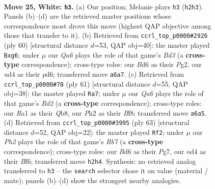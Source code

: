 \documentclass[11pt]{article}
\begin{document}
\clearpage

\begin{figure}[p]\centering
\begin{subfigure}{0.46\textwidth}\centering
\resizebox{\linewidth}{!}{%
\newchessgame
\chessboard[
  setfen={4r1k1/p4p1p/Q2B2p1/8/3nr3/P4q2/5P1P/R5K1 w - - 5 25},
  showmover=false,
  pgfstyle=straightmove, color=movearrow, markmove={h2-h3}
]}
\caption{}
\end{subfigure}\hfill
\begin{subfigure}{0.46\textwidth}\centering
\resizebox{\linewidth}{!}{%
\newchessgame
\chessboard[
  setfen={3r1k2/1Q6/p2p2p1/4q1Pp/5r2/3B4/1PP3P1/1K1R4 w - - 3 31},
  showmover=false,
  pgfstyle=straightmove, color=movearrow, markmove={d3-g6}
]}
\caption{}
\end{subfigure}
\\[4pt]
\begin{subfigure}{0.46\textwidth}\centering
\resizebox{\linewidth}{!}{%
\newchessgame
\chessboard[
  setfen={1q3bk1/3r1p2/6pp/3Pp3/2R1Q3/4N1P1/5P1P/6K1 b - - 3 31},
  showmover=false,
  pgfstyle=straightmove, color=movearrow, markmove={d7-a7}
]}
\caption{}
\end{subfigure}\hfill
\begin{subfigure}{0.46\textwidth}\centering
\resizebox{\linewidth}{!}{%
\newchessgame
\chessboard[
  setfen={4Q3/p4ppk/5b1p/8/2q5/P3R3/1r4PP/6RK b - - 0 32},
  showmover=false,
  pgfstyle=straightmove, color=movearrow, markmove={b2-f2}
]}
\caption{}
\end{subfigure}
\caption{\textbf{Move 25, White: \texttt{h3}.} (a) Our position; Melanie plays \texttt{h3} (\texttt{h2h3}). Panels (b)--(d) are the retrieved master positions whose correspondence most drove this move (highest QAP objective among those that transfer to it). (b) Retrieved from \texttt{ccrl\_top\_p0000\#2926} (ply 60) [structural distance $d$=53, QAP obj=40]: the master played \texttt{Bxg6}; under $\mu$ our \emph{Qa6} plays the role of that game's \emph{Bd3} (a \textbf{cross-type} correspondence); cross-type roles: our \emph{B}d6 as their \emph{P}g2, our \emph{n}d4 as their \emph{p}d6; transferred move \texttt{a6a7}. (c) Retrieved from \texttt{ccrl\_top\_p0000\#78} (ply 61) [structural distance $d$=55, QAP obj=38]: the master played \texttt{Ra7}; under $\mu$ our \emph{Qa6} plays the role of that game's \emph{Rd2} (a \textbf{cross-type} correspondence); cross-type roles: our \emph{R}a1 as their \emph{Q}b8, our \emph{P}h2 as their \emph{B}f8; transferred move \texttt{a6a5}. (d) Retrieved from \texttt{ccrl\_top\_p0000\#3995} (ply 63) [structural distance $d$=52, QAP obj=22]: the master played \texttt{Rf2}; under $\mu$ our \emph{Ph2} plays the role of that game's \emph{Rb7} (a \textbf{cross-type} correspondence); cross-type roles: our \emph{B}d6 as their \emph{P}g7, our \emph{n}d4 as their \emph{B}f6; transferred move \texttt{h2h4}. Synthesis: no retrieved analog transferred to \texttt{h3} -- the \texttt{search} selector chose it on value (material / mate); panels (b)--(d) show the strongest nearby analogies.}
\label{fig:thought-m48}
\end{figure}
\end{document}
